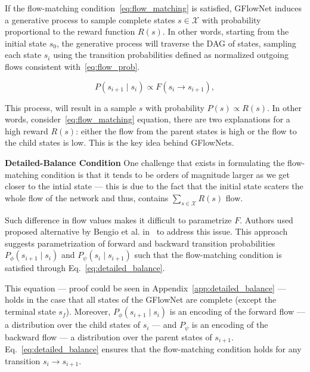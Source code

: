 \documentclass{lxaiproposal}
\begin{document}
    If the flow-matching condition~\eqref{eq:flow_matching} is satisfied, GFlowNet induces a generative process to
    sample complete states $s \in \mathcal{X}$ with probability proportional to the reward function $R(s)$. In other
    words, starting from the initial state $s_0$, the generative process will traverse the DAG of states, sampling
    each state $s_i$ using the transition probabilities defined as normalized outgoing flows consistent with~\eqref{eq:flow_prob}.

    \begin{equation}
        P(s_{i+1} \mid s_i) \propto F(s_i \to s_{i+1}),
        \label{eq:flow_prob}
    \end{equation}

    This process, will result in a sample $s$ with probability $P(s) \propto R(s)$. In other words, consider~\eqref{eq:flow_matching} equation, there are two explanations for a high reward $R(s)$: either the flow from the parent
    states is high or the flow to the child states is low. This is the key idea behind GFlowNets.


    \textbf{Detailed-Balance Condition} One challenge that exists in formulating the flow-matching condition is that it
    tends to be orders of magnitude larger as we get closer to the intial state --- this is due to the fact that the
    initial state scaters the whole flow of the network and thus, contains $\sum_{s \in \mathcal{X}} R(s)$ flow.

    Such difference in flow values makes it difficult to parametrize $F$. Authors used proposed alternative by Bengio
    et al. in~\cite{bengio2023gflownetfoundations} to address this issue. This approach suggests parametrization of
    forward and backward transition probabilities $P_{\phi}(s_{i+1} \mid s_i)$ and $P_{\psi}(s_i \mid s_{i+1})$ such
    that the flow-matching condition is satisfied through Eq.~\eqref{eq:detailed_balance}.

    This equation --- proof could be seen in Appendix~\ref{app:detailed_balance} --- holds in the case that all states of the GFlowNet are
    complete (except the terminal state $s_f$). Moreover, $P_{\phi}(s_{i+1} \mid s_i)$ is an encoding of the forward
    flow --- a distribution over the child states of $s_i$ --- and $P_{\psi}$ is an encoding of the backward flow --- a
    distribution over the parent states of $s_{i+1}$. Eq.~\eqref{eq:detailed_balance} ensures that the flow-matching
    condition holds for any transition $s_i \to s_{i+1}$.
\end{document}

